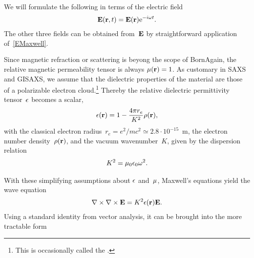 %
We will formulate the following in terms of the electric field
%
\begin{equation}\label{EstationaryX}
  \mathbf{E}(\mathbf{r},t) = \mathbf{E}(\mathbf{r})\mathrm e^{-i\omega t}.
\end{equation}
The other three fields can be obtained from~$\mathbf{E}$
by straightforward application of~\cref{EMaxwell}.

Since magnetic refraction or scattering is beyong the scope of BornAgain,
the relative magnetic permeability tensor is always $\mathbf{\mu}(\mathbf{r})=1$.
%
%
As customary in SAXS and GISAXS,
%
%
we assume
that the dielectric properties of the material are those of a polarizable electron cloud.\footnote
{This is occasionally called the 
%
 \cite{Lau31}.}
Thereby the relative dielectric permittivity tensor~$\mathbf{\epsilon}$
%
%
becomes a scalar,
\begin{equation}
  \epsilon(\mathbf{r})=1-\frac{4\pi r_e}{K^2}\rho(\mathbf{r}),
\end{equation}
%
%
with the classical electron radius~$r_e=e^2/mc^2\simeq2.8\cdot10^{-15}$~m,
%
%
%
the electron number density~$\rho(\mathbf{r})$,
%
%
%
and the vacuum wavenumber~$K$,
given by the dispersion relation
\begin{equation}
  K^2 = \mu_0\epsilon_0\omega^2.
\end{equation}
%

With these simplifying assumptions about $\mathbf{\epsilon}$ and~$\mathbf{\mu}$,
Maxwell's equations yield the wave equation
\begin{equation}\label{ENabCrossNabE}
  \mathbf{\nabla}\times\mathbf{\nabla}\times\mathbf{E} = K^2\epsilon(\mathbf{r})\mathbf{E}.
\end{equation}
%
%
Using a standard identity from vector analysis, it can be brought into the more tractable form

